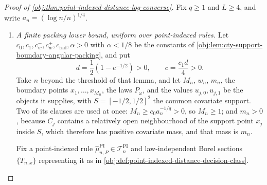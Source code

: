 \documentclass[11pt]{article}
\begin{document}
\begin{proof}[Proof of \cref{obj:thm:point-indexed-distance-log-converse}]
Fix \(q\geq 1\) and \(L\geq 4\), and write \(a_n=(\log n/n)^{1/4}\).
\begin{enumerate}
\item
\emph{A finite packing lower bound, uniform over point-indexed rules.}
Let \(c_0,c_1,c_w^-,c_w^+,c_{\mathrm{rad}},\alpha>0\) with \(\alpha<1/8\) be the constants of \cref{obj:lem:cty-support-boundary-angular-packing}, and put
\[
d=\frac12\left(1-e^{-1/2}\right)>0,
\qquad
c=\frac{c_1d}{4}>0 .
\]
Take \(n\) beyond the threshold of that lemma, and let \(M_n\), \(w_n\), \(m_n\), the boundary points \(x_1,\ldots,x_{M_n}\), the laws \(P_\omega\), and the values \(u_{j,0},u_{j,1}\) be the objects it supplies, with \(S=[-1/2,1/2]^2\) the common covariate support.  Two of its clauses are used at once: \(M_n\geq c_0a_n^{-1/q}>0\), so \(M_n\geq1\); and \(m_n>0\), because \(C_j\) contains a relatively open neighbourhood of the support point \(x_j\) inside \(S\), which therefore has positive covariate mass, and that mass is \(m_n\).

Fix a point-indexed rule \(\widehat\mu^{\mathrm{PI}}_{n,P}\in\mathcal T_n^{\mathrm{PI}}\) and law-independent Borel sections \(\{T_{n,x}\}\) representing it as in \cref{obj:def:point-indexed-distance-decision-class}.


\end{enumerate}
\end{proof}
\end{document}
